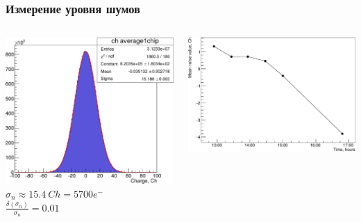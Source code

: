 \documentclass[14pt]{beamer}
\begin{document}
\begin{frame}[c]
\frametitle{Измерение уровня шумов}
\vspace{10pt}
\begin{columns}
	\begin{minipage}[t][1\textheight]{\linewidth}
		\includegraphics[width=1\linewidth]{Noise_stat.pdf}
		\vspace{15pt}
	 	\\ \centering \small{$ \sigma_{n} \approx 15.4~Ch = 5700 e^{-}$}
	 	\vspace{10pt}
	 	\\ \centering \small{$ \displaystyle \frac{\delta(\sigma_{n})}{\sigma_{n}} = 0.01 $}
	\end{minipage}%
	\begin{minipage}[t][1\textheight]{\linewidth}
	\begin{center}
	\vspace{-10pt}
	\includegraphics[width=0.7\linewidth]{Mean_time_drift.pdf}

\end{center}
\end{minipage}
\end{columns}
\end{frame}
\end{document}
